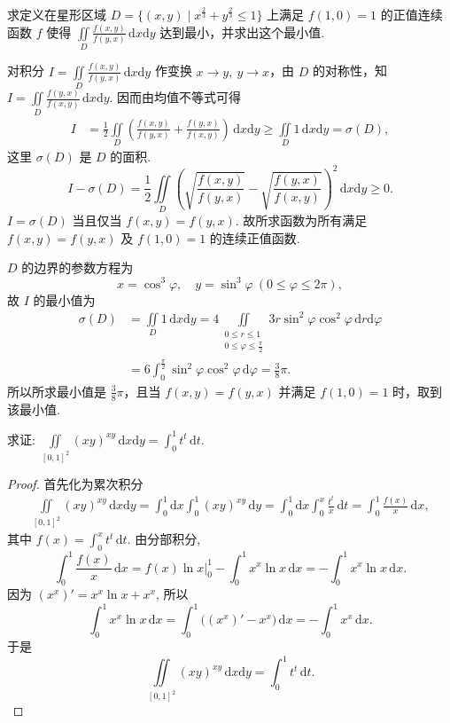 \documentclass[../../main.tex]{subfiles}%
\begin{document}
\begin{example}
求定义在星形区域 $D = \{(x,y) \mid x^{\frac{2}{3}} + y^{\frac{2}{3}} \leqslant 1\}$ 上满足 $f(1,0) = 1$ 的正值连续函数 $f$ 使得 $\iint\limits_D \frac{f(x,y)}{f(y,x)} \,\mathrm{d}x\mathrm{d}y$ 达到最小，并求出这个最小值.
\end{example}
\begin{solution}

对积分 $I = \iint\limits_D \frac{f(x,y)}{f(y,x)} \,\mathrm{d}x\mathrm{d}y$ 作变换 $x \to y,\ y \to x$，由 $D$ 的对称性，知 $I = \iint\limits_D \frac{f(y,x)}{f(x,y)} \,\mathrm{d}x\mathrm{d}y$. 因而由均值不等式可得
\begin{align*}
I &= \frac{1}{2} \iint\limits_D \left( \frac{f(x,y)}{f(y,x)} + \frac{f(y,x)}{f(x,y)} \right) \,\mathrm{d}x\mathrm{d}y \geqslant \iint\limits_D 1 \,\mathrm{d}x\mathrm{d}y = \sigma(D),
\end{align*}
这里 $\sigma(D)$ 是 $D$ 的面积.
\[
I - \sigma(D) = \frac{1}{2} \iint\limits_D \left( \sqrt{\frac{f(x,y)}{f(y,x)}} - \sqrt{\frac{f(y,x)}{f(x,y)}} \right)^2 \,\mathrm{d}x\mathrm{d}y \geqslant 0.
\]
$I = \sigma(D)$ 当且仅当 $f(x,y) = f(y,x)$. 故所求函数为所有满足 $f(x,y) = f(y,x)$ 及 $f(1,0) = 1$ 的连续正值函数.

$D$ 的边界的参数方程为
\[
x = \cos^3 \varphi,\quad y = \sin^3 \varphi\ (0 \leqslant \varphi \leqslant 2\pi),
\]
故 $I$ 的最小值为
\begin{align*}
\sigma(D) &= \iint\limits_D 1 \,\mathrm{d}x\mathrm{d}y = 4 \iint\limits_{\substack{0 \leqslant r \leqslant 1 \\ 0 \leqslant \varphi \leqslant \frac{\pi}{2}}} 3r \sin^2 \varphi \cos^2 \varphi \,\mathrm{d}r\mathrm{d}\varphi \\
&= 6 \int_0^{\frac{\pi}{2}} \sin^2 \varphi \cos^2 \varphi \,\mathrm{d}\varphi = \frac{3}{8}\pi.
\end{align*}
所以所求最小值是 $\frac{3}{8}\pi$，且当 $f(x,y) = f(y,x)$ 并满足 $f(1,0) = 1$ 时，取到该最小值.

\end{solution}

\begin{example}
求证: $\iint\limits_{[0,1]^2} (xy)^{xy} \, \mathrm{d}x\mathrm{d}y = \int_0^1 t^t \, \mathrm{d}t$.
\end{example}
\begin{proof}

首先化为累次积分
\begin{align*}
\iint\limits_{[0,1]^2} (xy)^{xy} \, \mathrm{d}x\mathrm{d}y = \int_0^1 \mathrm{d}x \int_0^1 (xy)^{xy} \, \mathrm{d}y = \int_0^1 \mathrm{d}x \int_0^x \frac{t^t}{x} \, \mathrm{d}t = \int_0^1 \frac{f(x)}{x} \, \mathrm{d}x,
\end{align*}
其中 $f(x) = \int_0^x t^t \, \mathrm{d}t$. 由分部积分,
\[
\int_0^1 \frac{f(x)}{x} \, \mathrm{d}x = f(x) \ln x \bigg|_0^1 - \int_0^1 x^x \ln x \, \mathrm{d}x = - \int_0^1 x^x \ln x \, \mathrm{d}x.
\]
因为 $(x^x)' = x^x \ln x + x^x$, 所以
\[
\int_0^1 x^x \ln x \, \mathrm{d}x = \int_0^1 \big( (x^x)' - x^x \big) \, \mathrm{d}x = - \int_0^1 x^x \, \mathrm{d}x.
\]
于是
\[
\iint\limits_{[0,1]^2} (xy)^{xy} \, \mathrm{d}x\mathrm{d}y = \int_0^1 t^t \, \mathrm{d}t.
\]

\end{proof}
\end{document}
